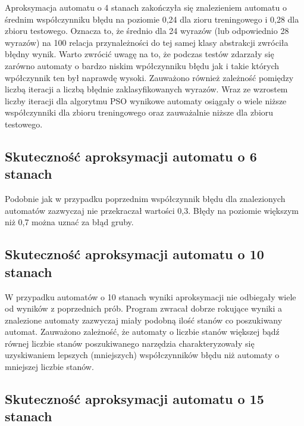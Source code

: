 \documentclass[runningheads,a4paper]{llncs}
\begin{document}
Aproksymacja automatu o 4 stanach zakończyła się znalezieniem automatu o średnim współczynniku błędu na poziomie 0,24 dla zioru treningowego i 0,28 dla zbioru testowego. Oznacza to, że średnio dla 24 wyrazów (lub odpowiednio 28 wyrazów) na 100 relacja przynależności do tej samej klasy abstrakcji zwróciła błędny wynik. Warto zwrócić uwagę na to, że podczas testów zdarzały się zarówno automaty o bardzo niskim wpółczynniku błędu jak i takie których wpółczynnik ten był naprawdę wysoki. Zauważono również zależność pomiędzy liczbą iteracji a liczbą błędnie zaklasyfikowanych wyrazów. Wraz ze wzrostem liczby iteracji dla algorytmu PSO wynikowe automaty osiągały o wiele niższe współczynniki dla zbioru treningowego oraz zauważalnie niższe dla zbioru testowego. \\

\FloatBarrier
\subsection{Skuteczność aproksymacji automatu o 6 stanach}

Podobnie jak w przypadku poprzednim współczynnik błędu dla znalezionych automatów zazwyczaj nie przekraczał wartości 0,3. Błędy na poziomie większym niż 0,7 można uznać za błąd gruby. \\

\FloatBarrier
\subsection{Skuteczność aproksymacji automatu o 10 stanach}

W przypadku automatów o 10 stanach wyniki aproksymacji nie odbiegały wiele od wyników z poprzednich prób. Program zwracał dobrze rokujące wyniki a znalezione automaty zazwyczaj miały podobną ilość stanów co poszukiwany automat. Zauważono zależność, że automaty o liczbie stanów większej bądź równej liczbie stanów poszukiwanego narzędzia charakteryzowały się uzyskiwaniem lepszych (mniejszych) współczynników błędu niż automaty o mniejszej liczbie stanów. \\

\FloatBarrier
\subsection{Skuteczność aproksymacji automatu o 15 stanach}
\end{document}
